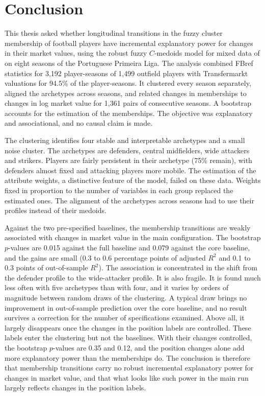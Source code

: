 \chapter{Conclusion}
\label{ch:conclusion}

This thesis asked whether longitudinal transitions in the fuzzy cluster membership of football players have incremental explanatory power for changes in their market values, using the robust fuzzy $C$-medoids model for mixed data of  on eight seasons of the Portuguese Primeira Liga. The analysis combined FBref statistics for 3,192 player-seasons of 1,499 outfield players with Transfermarkt valuations for 94.5\% of the player-seasons. It clustered every season separately, aligned the archetypes across seasons, and related changes in memberships to changes in log market value for 1,361 pairs of consecutive seasons. A bootstrap accounts for the estimation of the memberships. The objective was explanatory and associational, and no causal claim is made.

The clustering identifies four stable and interpretable archetypes and a small noise cluster. The archetypes are defenders, central midfielders, wide attackers and strikers. Players are fairly persistent in their archetype (75\% remain), with defenders almost fixed and attacking players more mobile. The estimation of the attribute weights, a distinctive feature of the model, failed on these data. Weights fixed in proportion to the number of variables in each group replaced the estimated ones. The alignment of the archetypes across seasons had to use their profiles instead of their medoids.

Against the two pre-specified baselines, the membership transitions are weakly associated with changes in market value in the main configuration. The bootstrap $p$-values are 0.015 against the full baseline and 0.079 against the core baseline, and the gains are small (0.3 to 0.6 percentage points of adjusted $R^2$ and 0.1 to 0.3 points of out-of-sample $R^2$). The association is concentrated in the shift from the defender profile to the wide-attacker profile. It is also fragile. It is found much less often with five archetypes than with four, and it varies by orders of magnitude between random draws of the clustering. A typical draw brings no improvement in out-of-sample prediction over the core baseline, and no result survives a correction for the number of specifications examined. Above all, it largely disappears once the changes in the position labels are controlled. These labels enter the clustering but not the baselines. With their changes controlled, the bootstrap $p$-values are 0.35 and 0.12, and the position changes alone add more explanatory power than the memberships do. The conclusion is therefore that membership transitions carry no robust incremental explanatory power for changes in market value, and that what looks like such power in the main run largely reflects changes in the position labels.

